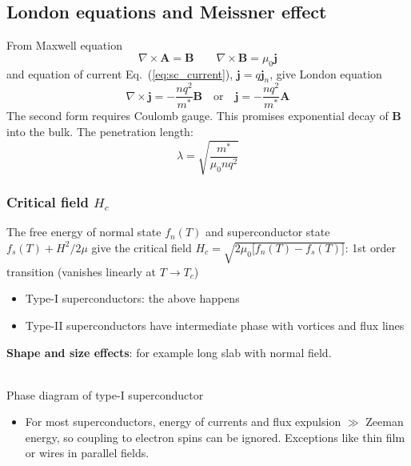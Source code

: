 \documentclass[11pt,letterpaper]{article}
\numberwithin{equation}{section} %
\renewcommand*{\vec}[1]{\bm{#1}}
\begin{document}
\subsection{London equations and Meissner effect}
\label{sub:Meissner effect}
From Maxwell equation 
\begin{equation}
  \nabla\times\vec A = \vec B \qquad \nabla\times\vec B = \mu_0\vec j
\end{equation}
and equation of current Eq.~(\ref{eq:sc_current}), $\vec j = q\vec j_n$,
give London equation
\begin{equation}
	\nabla\times\vec j = -\frac{n q^2}{m^*}\vec B
	\mbox{~~~or~~~}
	\vec j = -\frac{nq^2}{m^*}\vec A
\end{equation}
The second form requires Coulomb gauge. This promises exponential decay of
$\vec B$ into the bulk. The penetration length: 
\begin{equation}\label{eq:penetration_length}
	\lambda = \sqrt{\frac{m^*}{\mu_0 n q^2}}
\end{equation}

\subsubsection[Critical field Hc]{Critical field $H_c$}
\label{ssub:critical_field}
The free energy of normal state $f_n(T)$ and superconductor state $f_s(T) +
H^2/2\mu$ give the critical field $H_c =
\sqrt{2\mu_0\big[f_n(T)-f_s(T)\big]}$: 1st order transition (vanishes
linearly at $T\to T_c$)
\begin{itemize}
  \item Type-I superconductors: the above happens
  \item Type-II superconductors have intermediate phase with vortices and
	  flux lines
\end{itemize}

\textbf{Shape and size effects}: for example long slab with normal field. 
\begin{center}
\\
Phase diagram of type-I superconductor
\end{center}
\begin{itemize}
  \item For most superconductors, energy of currents and flux expulsion $\gg$
	  Zeeman energy, so coupling to electron spins can be ignored. Exceptions
	  like thin film or wires in parallel fields. 
\end{itemize}
\end{document}
